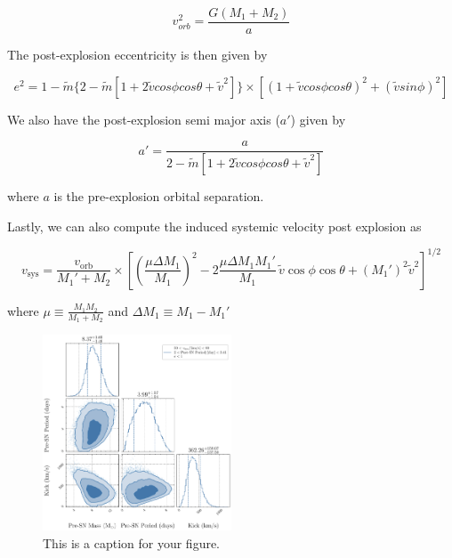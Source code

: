 \documentclass[linenumbers,trackchanges,twocolumn]{aastex701}
\begin{document}
\begin{equation}
    v_{orb}^2 = \frac{G(M_1+M_2)}{a}
\end{equation}

The post-explosion eccentricity is then given by

\begin{equation}
    e^2 = 1 - \tilde{m}\{2-\tilde{m}[1+2\tilde{v}cos\phi cos\theta + \tilde{v}^2]\} \times [(1+\tilde{v}cos\phi cos\theta)^2 + (\tilde{v}sin\phi)^2]
\end{equation}

We also have the post-explosion semi major axis ($a'$) given by 

\begin{equation}
    a' = \frac{a}{2-\tilde{m}[1+2\tilde{v}cos\phi cos\theta + \tilde{v}^2]}
\end{equation}

where $a$ is the pre-explosion orbital separation.

Lastly, we can also compute the induced systemic velocity post explosion as 

\begin{equation}
v_{\mathrm{sys}} = \frac{v_{\mathrm{orb}}}{M_1' + M_2}
\times \left[
\left( \frac{\mu \Delta M_1}{M_1} \right)^2
- 2 \frac{\mu \Delta M_1 M_1'}{M_1} \, \tilde{v} \cos \phi \cos \theta
+ (M_1')^2 \tilde{v}^2
\right]^{1/2}
\end{equation}

where $\mu \equiv \frac{M_1 M_2}{M_1 + M_2}$ and $\Delta M_1 \equiv M_1 - M_1'$

\begin{figure}[htbp]
    \centering
    \includegraphics[width=0.5\textwidth]{xrb-monte-carlo-mass-period-kick.pdf}
    \caption{This is a caption for your figure.}
    \label{fig:xrb_monte_carlo}
\end{figure}
\end{document}

